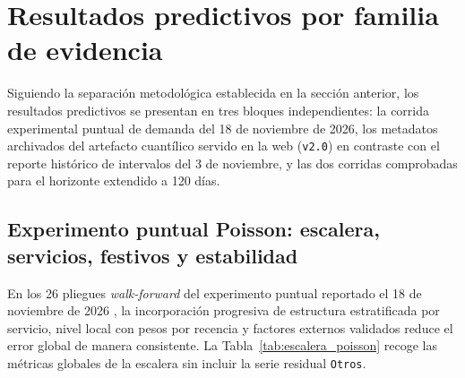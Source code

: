 
\section{Resultados predictivos por familia de evidencia}

Siguiendo la separación metodológica establecida en la sección anterior, los resultados predictivos se presentan en tres bloques independientes: la corrida experimental puntual de demanda del 18 de noviembre de 2026, los metadatos archivados del artefacto cuantílico servido en la web (\texttt{v2.0}) en contraste con el reporte histórico de intervalos del 3 de noviembre, y las dos corridas comprobadas para el horizonte extendido a 120 días.

\subsection{Experimento puntual Poisson: escalera, servicios, festivos y estabilidad}

En los 26 pliegues \textit{walk-forward} del experimento puntual reportado el 18 de noviembre de 2026 \parencite{mediflow2026demanda}, la incorporación progresiva de estructura estratificada por servicio, nivel local con pesos por recencia y factores externos validados reduce el error global de manera consistente. La Tabla~\ref{tab:escalera_poisson} recoge las métricas globales de la escalera sin incluir la serie residual \texttt{Otros}.

